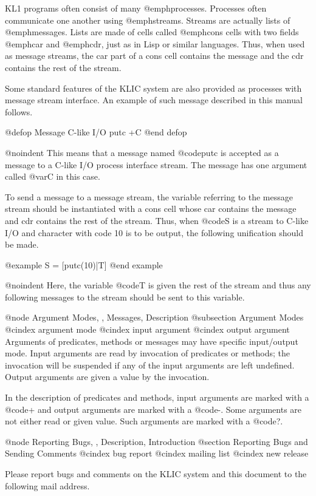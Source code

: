 KL1 programs often consist of many @emph{processes}.  Processes often
communicate one another using @emph{streams}.  Streams are actually
lists of @emph{messages}.  Lists are made of cells called @emph{cons}
cells with two fields @emph{car} and @emph{cdr}, just as in Lisp or
similar languages.  Thus, when used as message streams, the car part of
a cons cell contains the message and the cdr contains the rest of the
stream.

Some standard features of the KLIC system are also provided as processes
with message stream interface.  An example of such message described in
this manual follows.

@defop {Message} {C-like I/O} putc +C
@end defop

@noindent
This means that a message named @code{putc} is accepted as a message to
a C-like I/O process interface stream.  The message has one argument
called @var{C} in this case.

To send a message to a message stream, the variable referring to the
message stream should be instantiated with a cons cell whose car
contains the message and cdr contains the rest of the stream.  Thus,
when @code{S} is a stream to C-like I/O and character with code 10 is to
be output, the following unification should be made.

@example
S = [putc(10)|T]
@end example

@noindent
Here, the variable @code{T} is given the rest of the stream and thus any
following messages to the stream should be sent to this variable.

@node Argument Modes,  , Messages, Description
@subsection Argument Modes
@cindex argument mode
@cindex input argument
@cindex output argument
Arguments of predicates, methods or messages may have specific
input/output mode.  Input arguments are read by invocation of predicates
or methods; the invocation will be suspended if any of the input
arguments are left undefined.  Output arguments are given a value by the
invocation.

In the description of predicates and methods, input arguments are marked
with a @code{+} and output arguments are marked with a @code{-}.  Some
arguments are not either read or given value.  Such arguments are marked
with a @code{?}.

@node Reporting Bugs,  , Description, Introduction
@section Reporting Bugs and Sending Comments
@cindex bug report
@cindex mailing list
@cindex new release

Please report bugs and comments on the KLIC system and this document to
the following mail address.

